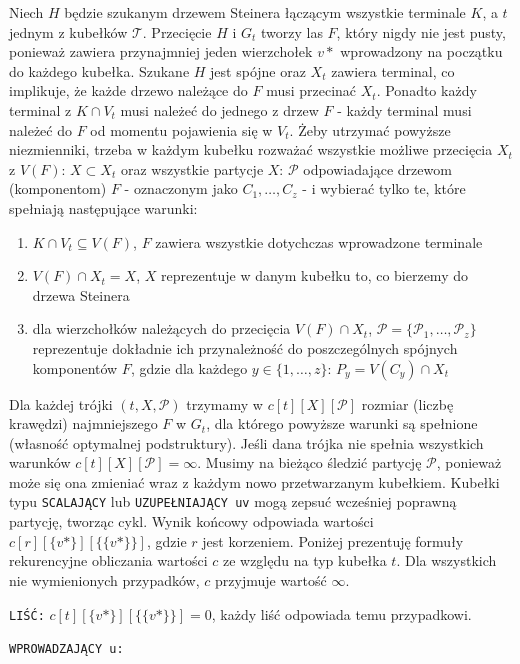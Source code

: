 \documentclass[12pt, oneside]{report}
\begin{document}
Niech $H$ będzie szukanym drzewem Steinera łączącym wszystkie terminale $K$, a $t$ jednym z kubełków $\mathcal{T}$. Przecięcie $H$ i $G_t$ tworzy las $F$, który nigdy nie jest pusty, ponieważ zawiera przynajmniej jeden wierzchołek $v*$ wprowadzony na początku do każdego kubełka. Szukane $H$ jest spójne oraz $X_t$ zawiera terminal, co implikuje, że każde drzewo należące do $F$ musi przecinać $X_t$. Ponadto każdy terminal z $K \cap V_t$ musi należeć do jednego z drzew $F$ - każdy terminal musi należeć do $F$ od momentu pojawienia się w $V_t$. Żeby utrzymać powyższe niezmienniki, trzeba w każdym kubełku rozważać wszystkie możliwe przecięcia $X_t$ z $V(F)$: $X \subset{X_t}$ oraz wszystkie partycje $X$: $\mathcal{P}$ odpowiadające drzewom (komponentom) $F$ - oznaczonym jako $C_1, \dots, C_z$ - i wybierać tylko te, które spełniają następujące warunki: 
\begin{enumerate}
\item{$K \cap V_t \subseteq V(F)$, $F$ zawiera wszystkie dotychczas wprowadzone terminale}
\item{$V(F) \cap X_t = X$, $X$ reprezentuje w danym kubełku to, co bierzemy do drzewa Steinera}
\item{dla wierzchołków należących do przecięcia $V(F) \cap X_t$, $\mathcal{P} = \{\mathcal{P}_1, \dots, \mathcal{P}_z\}$ reprezentuje dokładnie ich przynależność do poszczególnych spójnych komponentów $F$, gdzie dla każdego $y \in \{1, \dots, z\}$: $P_y = V(C_y) \cap X_t$}
\end{enumerate}
Dla każdej trójki $(t, X, \mathcal{P})$ trzymamy w $c[t][X][\mathcal{P}]$ rozmiar (liczbę krawędzi) najmniejszego $F$ w $G_t$, dla którego powyższe warunki są spełnione (własność optymalnej podstruktury). Jeśli dana trójka nie spełnia wszystkich warunków $c[t][X][\mathcal{P}] = \infty$. Musimy na bieżąco śledzić partycję $\mathcal{P}$, ponieważ może się ona zmieniać wraz z każdym nowo przetwarzanym kubełkiem. Kubełki typu \texttt{SCALAJĄCY} lub \texttt{UZUPEŁNIAJĄCY uv} mogą zepsuć wcześniej poprawną partycję, tworząc cykl. Wynik końcowy odpowiada wartości $c[r][\{v*\}][\{\{v*\}\}]$, gdzie $r$ jest korzeniem. Poniżej prezentuję formuły rekurencyjne obliczania wartości $c$ ze względu na typ kubełka $t$. Dla wszystkich nie wymienionych przypadków, $c$ przyjmuje wartość $\infty$. \newline

\texttt{LIŚĆ:} $c[t][\{v*\}][\{\{v*\}\}] = 0$, każdy liść odpowiada temu przypadkowi.

\texttt{WPROWADZAJĄCY u:} 
\end{document}
